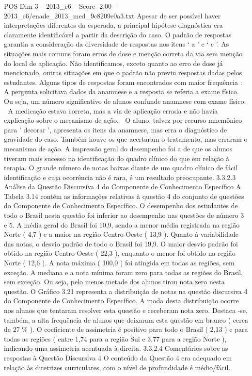 \begin{textsample}{POS Dim 3 – 2013\_c6 – Score -2.00 – 2013\_c6/enade\_2013\_med\_9c8209e0a3.txt}
Apesar de ser possível haver interpretações diferentes da esperada, a principal hipótese diagnóstica era claramente identificável a partir da descrição do caso.
O padrão de respostas garantia a consideração da diversidade de respostas nos itens ‘ a ’ e ‘ c ’.
As situações mais comuns foram erros de dose e menção correta da via sem menção do local de aplicação.
Não identificamos, exceto quanto ao erro de dose já mencionado, outras situações em que o padrão não previu respostas dadas pelos estudantes.
Alguns tipos de respostas foram encontrados com maior frequência :  A pergunta solicitava dados da anamnese e a resposta se referia a exame físico.
Ou seja, um número significativo de alunos confunde anamnese com exame físico.  A medicação estava correta, mas a via de aplicação errada e não havia explicação sobre o mecanismo de ação.  O aluno, talvez por recurso mnemônico para ' decorar ', apresenta os itens da anamnese, mas erra o diagnóstico de gravidade do caso.
Também houve os que acertaram o tratamento, mas erraram o mecanismo de ação.
A impressão geral do desempenho foi a de que os alunos tiveram mais sucesso na identificação do quadro clínico do que em relação à terapia.
O grande número de notas baixas diante de um quadro clínico de fácil identificação e cuja ocorrência não é rara, é um resultado preocupante. 3.3.2.3 Análise da Questão Discursiva 4 do Componente de Conhecimento Específico A Tabela 3.14 contém as informações relativas à questão 4 do conjunto de questões do Componente de Conhecimento Específico.
O desempenho dos estudantes de todo o Brasil nesta questão foi inferior ao desempenho nas questões de número 3 e 5.
A média geral do Brasil foi 10,9, sendo a menor média registrada na região Norte ( 4,7 ) e a maior na região Centro-Oeste ( 13,9 ).
Quanto à variabilidade das notas, o desvio padrão de todo o Brasil foi 19,9.
O maior desvio padrão foi obtido na região Centro-Oeste ( 22,3 ), enquanto o menor foi obtido na região Norte ( 12,6 ).
A nota máxima ( 100,0 ) foi atingida em todas as regiões, sem exceção.
A mediana e a nota mínima foram zero para todas as regiões do Brasil, sem exceção.
Ou seja, pelo menos metade dos alunos tirou nota zero nesta questão.
O Gráfico 3.21 representa a distribuição de notas na questão discursiva 4 do Componente de Conhecimento Específico.
A moda desta distribuição ocorre nos alunos que tentaram resolver esta questão e receberam nota zero.
Destaca -se, também, a alta frequência de alunos que deixaram esta questão em branco ( cerca de 27 \% ).
O coeficiente de assimetria é positivo para todo o Brasil ( 2,13 ) e para todas as regiões ( entre 1,74 para a região Sul e 3,77 para a região Norte ), indicando uma assimetria acentuada à direita. 3.3.2.4 Comentários sobre as respostas à Questão Discursiva 4 O conteúdo da Questão 4 era adequado em relação às diretrizes curriculares, com o nível de profundidade é médio/fácil.

\end{textsample}
